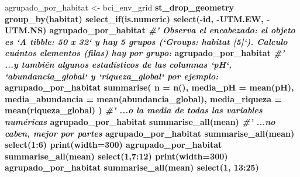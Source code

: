 \documentclass[11pt,]{article}
\newenvironment{Shaded}{\begin{snugshade}}{\end{snugshade}}
\newcommand{\KeywordTok}[1]{\textcolor[rgb]{0.13,0.29,0.53}{\textbf{#1}}}
\newcommand{\DataTypeTok}[1]{\textcolor[rgb]{0.13,0.29,0.53}{#1}}
\newcommand{\DecValTok}[1]{\textcolor[rgb]{0.00,0.00,0.81}{#1}}
\newcommand{\StringTok}[1]{\textcolor[rgb]{0.31,0.60,0.02}{#1}}
\newcommand{\CommentTok}[1]{\textcolor[rgb]{0.56,0.35,0.01}{\textit{#1}}}
\newcommand{\OperatorTok}[1]{\textcolor[rgb]{0.81,0.36,0.00}{\textbf{#1}}}
\newcommand{\NormalTok}[1]{#1}
\begin{document}
\begin{Shaded}
\begin{Highlighting}[]
{{{{{{{{{{{{{{{{{{{{{{{{{{{{{{{{{{{{{{{{{{{{{{\NormalTok{agrupado_por_habitat <-}\StringTok{ }\NormalTok{bci_env_grid }\OperatorTok{%
\StringTok{  }\NormalTok{st_drop_geometry }\OperatorTok{%
\StringTok{  }\KeywordTok{group_by}\NormalTok{(habitat) }\OperatorTok{%
\StringTok{  }\KeywordTok{select_if}\NormalTok{(is.numeric) }\OperatorTok{%
\StringTok{  }\KeywordTok{select}\NormalTok{(}\OperatorTok{-}\NormalTok{id, }\OperatorTok{-}\NormalTok{UTM.EW, }\OperatorTok{-}\NormalTok{UTM.NS)}
\NormalTok{agrupado_por_habitat}
\CommentTok{#' Observa el encabezado: el objeto es `A tibble: 50 x 32` y hay 5 grupos (`Groups:   habitat [5]`). Calculo cuántos elementos (filas) hay por grupo:}
\NormalTok{agrupado_por_habitat }\OperatorTok{%
\CommentTok{#' ...y también algunos estadísticos de las columnas `pH`, `abundancia_global` y `riqueza_global` por ejemplo:}
\NormalTok{agrupado_por_habitat }\OperatorTok{%
\StringTok{  }\KeywordTok{summarise}\NormalTok{(}
    \DataTypeTok{n =} \KeywordTok{n}\NormalTok{(),}
    \DataTypeTok{media_pH =} \KeywordTok{mean}\NormalTok{(pH),}
    \DataTypeTok{media_abundancia =} \KeywordTok{mean}\NormalTok{(abundancia_global),}
    \DataTypeTok{media_riqueza =} \KeywordTok{mean}\NormalTok{(riqueza_global)}
\NormalTok{  )}
\CommentTok{#' ...o la media de todas las variables numéricas}
\NormalTok{agrupado_por_habitat }\OperatorTok{%
\StringTok{  }\KeywordTok{summarise_all}\NormalTok{(mean)}
\CommentTok{#' ...no caben, mejor por partes}
\NormalTok{agrupado_por_habitat }\OperatorTok{%
\StringTok{  }\KeywordTok{summarise_all}\NormalTok{(mean) }\OperatorTok{%
\StringTok{  }\KeywordTok{select}\NormalTok{(}\DecValTok{1}\OperatorTok{:}\DecValTok{6}\NormalTok{) }\OperatorTok{%
\StringTok{  }\KeywordTok{print}\NormalTok{(}\DataTypeTok{width=}\DecValTok{300}\NormalTok{)}
\NormalTok{agrupado_por_habitat }\OperatorTok{%
\StringTok{  }\KeywordTok{summarise_all}\NormalTok{(mean) }\OperatorTok{%
\StringTok{  }\KeywordTok{select}\NormalTok{(}\DecValTok{1}\NormalTok{,}\DecValTok{7}\OperatorTok{:}\DecValTok{12}\NormalTok{) }\OperatorTok{%
\StringTok{  }\KeywordTok{print}\NormalTok{(}\DataTypeTok{width=}\DecValTok{300}\NormalTok{)}
\NormalTok{agrupado_por_habitat }\OperatorTok{%
\StringTok{  }\KeywordTok{summarise_all}\NormalTok{(mean) }\OperatorTok{%
\StringTok{  }\KeywordTok{select}\NormalTok{(}\DecValTok{1}\NormalTok{, }\DecValTok{13}\OperatorTok{:}\DecValTok{25}\NormalTok{) }\OperatorTok{%
}}}}}}}}}}}}}}}}}}}}}}}}}}}}}}}}}}}}}}}}}}}}}}}}}}}}}}}}}}}}}}
\end{Highlighting}
\end{Shaded}
\end{document}
